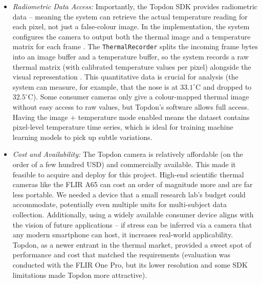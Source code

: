 \documentclass{report}
\begin{document}
\begin{itemize}
        \item \textit{Radiometric Data Access:} Importantly, the Topdon SDK provides radiometric data -- meaning the system can retrieve the actual temperature reading for each pixel, not just a false-colour image. In the implementation, the system configures the camera to output both the thermal image and a temperature matrix for each frame \cite{topdon20}. The \texttt{ThermalRecorder} splits the incoming frame bytes into an image buffer and a temperature buffer, so the system records a raw thermal matrix (with calibrated temperature values per pixel) alongside the visual representation \cite{topdon20}. This quantitative data is crucial for analysis (the system can measure, for example, that the nose is at $33.1^{\circ}$C and dropped to $32.5^{\circ}$C). Some consumer cameras only give a colour-mapped thermal image without easy access to raw values, but Topdon's software allows full access. Having the image + temperature mode enabled \cite{topdon20} means the dataset contains pixel-level temperature time series, which is ideal for training machine learning models to pick up subtle variations.

        \item \textit{Cost and Availability:} The Topdon camera is relatively affordable (on the order of a few hundred USD) and commercially available. This made it feasible to acquire and deploy for this project. High-end scientific thermal cameras like the FLIR A65 can cost an order of magnitude more and are far less portable. We needed a device that a small research lab's budget could accommodate, potentially even multiple units for multi-subject data collection. Additionally, using a widely available consumer device aligns with the vision of future applications -- if stress can be inferred via a camera that any modern smartphone can host, it increases real-world applicability. Topdon, as a newer entrant in the thermal market, provided a sweet spot of performance and cost that matched the requirements (evaluation was conducted with the FLIR One Pro, but its lower resolution and some SDK limitations made Topdon more attractive).


\end{itemize}
\end{document}
